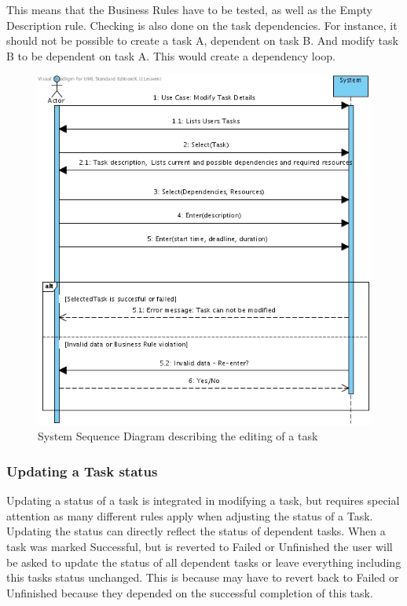 			This means that the Business Rules have to be tested, as well as the Empty Description rule. Checking is also done on the task dependencies. For instance, it should not be possible to create a task A, dependent on task B. And modify task B to be dependent on task A. This would create a dependency loop.\\
			\begin{figure}[H]
				\begin{center}
					\includegraphics[scale=0.5]{images/ssd_modify_task.jpg}
				\end{center}
				\caption{System Sequence Diagram describing the editing of a task}
			\end{figure}
			 \subsubsection{Updating a Task status}
			Updating a status of a task is integrated in modifying a task, but requires special attention as many different rules apply when adjusting the status of a Task.
			Updating the status can directly reflect the status of dependent tasks. When a task was marked Successful, but is reverted to Failed or Unfinished the user will be asked to update the status of all dependent tasks or leave everything including this tasks status unchanged. This is because may have to revert back to Failed or Unfinished because they depended on the successful completion of this task.

